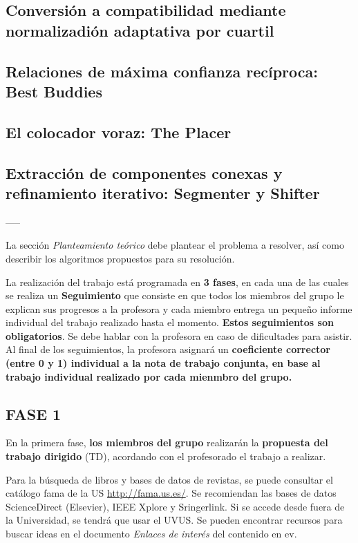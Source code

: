 \documentclass[a4paper]{article}
\theoremstyle{plain} %
\theoremstyle{plain} %
\begin{document}
\subsection{Conversión a compatibilidad mediante normalizadión adaptativa por cuartil}

\subsection{Relaciones de máxima confianza recíproca: Best Buddies}

\subsection{El colocador voraz: The Placer}

\subsection{Extracción de componentes conexas y refinamiento iterativo: Segmenter y Shifter}





-----

La sección \textit{Planteamiento teórico} debe plantear el problema a resolver, así como describir los algoritmos propuestos para su resolución. 

La realización del trabajo está programada en {\bf 3 fases}, en cada una de las cuales se realiza un {\bf Seguimiento} que consiste en que todos los miembros del grupo le explican sus progresos a la profesora y cada miembro entrega un pequeño informe individual del trabajo realizado hasta el momento. {\bf Estos seguimientos son obligatorios}. Se debe hablar con la profesora en caso de dificultades para asistir. Al final de los seguimientos, la profesora asignará un {\bf coeficiente corrector (entre 0 y 1) individual a la nota de trabajo conjunta, en base al trabajo individual realizado por cada mienmbro del grupo. }
\subsection*{FASE 1}
En la primera fase, \textbf{los miembros del grupo} realizarán la \textbf{propuesta del trabajo dirigido} (TD), acordando con el profesorado el trabajo a realizar. 

Para la búsqueda de libros y bases de datos de revistas, se puede consultar el catálogo fama de la US \url{http://fama.us.es/}. Se recomiendan las bases de datos ScienceDirect (Elsevier), IEEE Xplore y Sringerlink. Si se accede desde fuera de la Universidad, se tendrá que usar el UVUS. Se pueden encontrar recursos para buscar ideas en el documento \textit{Enlaces de interés} del contenido en ev.
\end{document}
